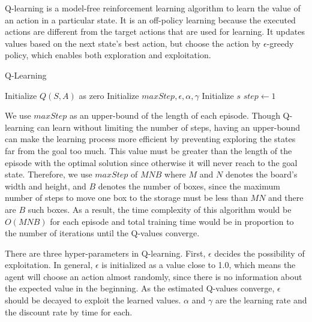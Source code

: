 \documentclass{article}
\begin{document}
Q-learning is a model-free reinforcement learning algorithm to learn the value of an action in a particular state. It is an off-policy learning because the executed actions are different from the target actions that are used for learning. It updates values based on the next state's best action, but choose the action by $\epsilon$-greedy policy, which enables both exploration and exploitation.

\begin{algorithm}[H]
\caption{Q-Learning}\label{alg:one}
Initialize $Q(S, A)$ as zero\;
Initialize $maxStep, \epsilon, \alpha, \gamma$\;
Initialize $s$ 
$step \gets 1$\;

\end{algorithm}

We use $maxStep$ as an upper-bound of the length of each episode. Though Q-learning can learn without limiting the number of steps, having an upper-bound can make the learning process more efficient by preventing exploring the states far from the goal too much. This value must be greater than the length of the episode with the optimal solution since otherwise it will never reach to the goal state. Therefore, we use $maxStep$ of $MNB$ where $M$ and $N$ denotes the board's width and height, and $B$ denotes the number of boxes, since the maximum number of steps to move one box to the storage must be less than $MN$ and there are $B$ such boxes. As a result, the time complexity of this algorithm would be $O(MNB)$ for each episode and total training time would be in proportion to the number of iterations until the Q-values converge.

There are three hyper-parameters in Q-learning. First, $\epsilon$ decides the possibility of exploitation. In general, $\epsilon$ is initialized as a value close to 1.0, which means the agent will choose an action almost randomly, since there is no information about the expected value in the beginning. As the estimated Q-values converge, $\epsilon$ should be decayed to exploit the learned values. $\alpha$ and $\gamma$ are the learning rate and the discount rate by time for each.  
\end{document}

